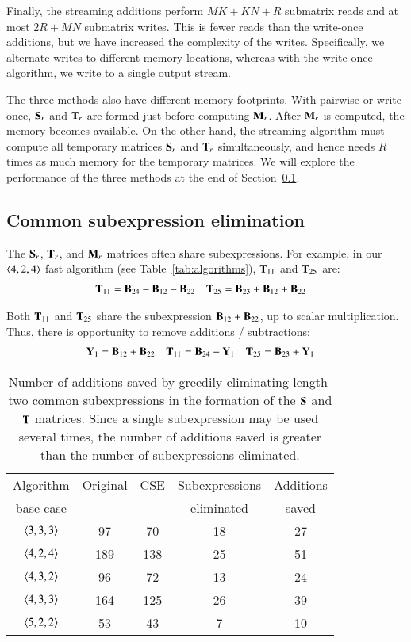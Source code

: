 \documentclass[preprint]{sigplanconf}
\newcommand{\M}[2][]{{\bm{#1\mathbf{\MakeUppercase{#2}}}}}
\begin{document}
Finally, the streaming additions perform $MK + KN + R$ submatrix reads and at most $2R + MN$ submatrix writes.
This is fewer reads than the write-once additions, but we have increased the complexity of the writes.
Specifically, we alternate writes to different memory locations, whereas with the write-once algorithm, we write to a single output stream.


The three methods also have different memory footprints.
With pairwise or write-once, $\M{S}_r$ and $\M{T}_r$ are formed just before computing $\M{M}_r$.
After $\M{M}_r$ is computed, the memory becomes available.
On the other hand, the streaming algorithm must compute all temporary matrices $\M{S}_r$ and $\M{T}_r$ simultaneously,
and hence needs $R$ times as much memory for the temporary matrices.
We will explore the performance of the three methods at the end of Section~\ref{sec:cse}.

\subsection{Common subexpression elimination}
\label{sec:cse}

The $\M{S}_r$, $\M{T}_r$, and $\M{M}_r$ matrices often share subexpressions.
For example, in our $\left\langle4, 2, 4\right\rangle$ fast algorithm (see Table~\ref{tab:algorithms}),
$\M{T}_{11}$ and $\M{T}_{25}$ are:
\begin{align*}
\M{T}_{11} &= \M{B}_{24} - \M{B}_{12} - \M{B}_{22} & \M{T}_{25} &= \M{B}_{23} + \M{B}_{12} + \M{B}_{22}
\end{align*}

Both $\M{T}_{11}$ and $\M{T}_{25}$ share the subexpression $\M{B}_{12} + \M{B}_{22}$, up to scalar multiplication.
Thus, there is opportunity to remove additions / subtractions:
\begin{align*}
\M{Y}_1 &= \M{B}_{12} + \M{B}_{22} & \M{T}_{11} &= \M{B}_{24} - \M{Y}_1 & \M{T}_{25} &= \M{B}_{23} + \M{Y}_1
\end{align*}

\begin{table}[tb]
\centering
\caption{
Number of additions saved by greedily eliminating length-two common subexpressions in the formation of
the $\M{S}$ and $\M{T}$ matrices.
Since a single subexpression may be used several times, the number of additions saved is greater than the
number of subexpressions eliminated.
}
\begin{tabular}{c c c c c}
\toprule
Algorithm   & Original & CSE & Subexpressions & Additions \\
base case  &              &                 & eliminated & saved \\ \midrule
$\left\langle3, 3, 3\right\rangle$   & 97 & 70 & 18 & 27\\
$\left\langle4, 2, 4\right\rangle$   & 189 & 138 & 25 & 51\\
$\left\langle4, 3, 2\right\rangle$   & 96 & 72 & 13 & 24\\
$\left\langle4, 3, 3\right\rangle$   & 164 & 125 & 26 & 39\\
$\left\langle5, 2, 2\right\rangle$   & 53 & 43 & 7 & 10 \\
\bottomrule
\end{tabular}
\label{tab:cse}
\end{table}
\end{document}
